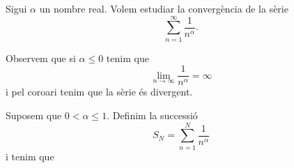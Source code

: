 \documentclass[../Apunts.tex]{subfiles}
\begin{document}
	\begin{example}
		\label{ex:sèrie harmònica}
		Sigui \(\alpha\) un nombre real. Volem estudiar la convergència de la sèrie
		\[\sum_{n=1}^{\infty}\frac{1}{n^{\alpha}}.\]
		\begin{solution}
			Observem que si \(\alpha\leq0\) tenim que
			\[\lim_{n\to\infty}\frac{1}{n^{\alpha}}=\infty\]
			i pel coro{\lgem}ari  tenim que la sèrie és divergent.
			
			Suposem que \(0<\alpha\leq1\). Definim la successió
			\[S_{N}=\sum_{n=1}^{N}\frac{1}{n^{\alpha}}\]
			i tenim que
		\end{solution}
	\end{example}
\end{document}
